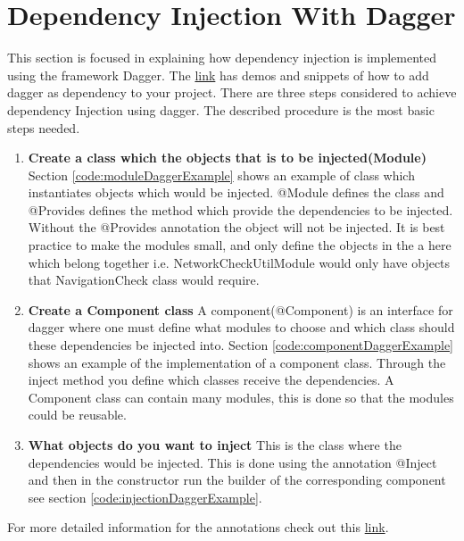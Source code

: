 \newpage
\section{Dependency Injection With Dagger}
    This section is focused in explaining how dependency injection is implemented
    using the framework Dagger.
    The \href{https://github.com/slidenerd/Vivz_Dagger_2_Demo}{link} has demos and snippets
    of how to add dagger as dependency to your project. There are three steps considered
    to achieve dependency Injection using dagger. The described procedure is the most
    basic steps needed. 
    \begin{enumerate}
        \item 
            \textbf{Create a class which the objects that is to be injected(Module)}
                Section \ref{code:moduleDaggerExample} shows an example of class which instantiates 
                objects which would be injected. @Module defines the class and @Provides
                defines the method which provide the dependencies to be injected. Without the
                @Provides annotation the object will not be injected. 
                It is best practice to make the modules small, and only define 
                the objects in the a here 
                which belong together i.e. NetworkCheckUtilModule would only have
                objects that NavigationCheck class would require.  
        \item 
            \textbf{Create a Component class}
                A component(@Component) is an interface for dagger where one  must define 
                what modules to choose and which class should these dependencies be injected into. 
                Section \ref{code:componentDaggerExample} shows an example of the implementation of a 
                component class.
                Through the inject method you define
                which classes receive the dependencies. A Component class can contain 
                many modules, this is done so that the modules could be reusable. 
        \item 
            \textbf{What objects do you want to inject}
                This is the class where the dependencies would be injected. This is done
                using the annotation @Inject and then in the constructor run the builder
                of the corresponding component see section \ref{code:injectionDaggerExample}. 
    \end{enumerate}
    For more detailed information for the annotations check out
    this \href{http://www.vogella.com/tutorials/Dagger/article.html}
    {link}.
